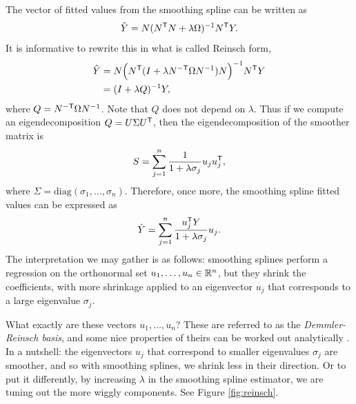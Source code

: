\documentclass{article}
\begin{document}
The vector of fitted values   from the smoothing spline can be written as
\[
\hat{Y} = N(N^{\mathsf{T}} N + \lambda \Omega)^{-1} N^{\mathsf{T}} Y.
\]
It is informative to rewrite this in what is called Reinsch form,
\begin{align*}
\hat{Y} 
&= N\Big(N^{\mathsf{T}} (I + \lambda N^{-\mathsf{T}} \Omega N^{-1}) N \Big)^{-1} N^{\mathsf{T}} Y \\
&= (I+\lambda Q)^{-1} Y,
\end{align*}
where $Q = N^{-\mathsf{T}} \Omega N^{-1}$. Note that $Q$ does not depend on $\lambda$.
Thus if we compute an eigendecomposition $Q = U \Sigma U^{\mathsf{T}}$, then the
eigendecomposition of the smoother matrix  is   
\[
S = \sum_{j=1}^n \frac{1}{1+\lambda \sigma_j} u_ju_j^{\mathsf{T}},
\]
where $\Sigma=\mathrm{diag}(\sigma_1,\dots,\sigma_n)$. Therefore, once more, the
smoothing spline fitted values can be expressed as  
\[
\hat{Y} = \sum_{j=1}^n \frac{u_j^{\mathsf{T}} Y}{1+\lambda \sigma_j} u_j.
\]
The interpretation we may gather is as follows: smoothing splines perform a 
regression on the orthonormal set $u_1,\dots,u_n \in \mathbb{R}^n$, but they shrink
the coefficients, with more shrinkage applied to an eigenvector $u_j$ that
corresponds to a large eigenvalue $\sigma_j$.  

What exactly are these vectors $u_1,\dots,u_n$? These are referred to as the 
\emph{Demmler-Reinsch basis}, and some nice properties of theirs can be 
worked out analytically \citep{demmler1975oscillation}. In a nutshell: the
eigenvectors $u_j$ that correspond to smaller eigenvalues $\sigma_j$ are
smoother, and so with smoothing splines, we shrink less in their direction. Or
to put it differently, by increasing $\lambda$ in the smoothing spline
estimator, we are tuning out the more wiggly components. See Figure
\ref{fig:reinsch}. 
\end{document}
